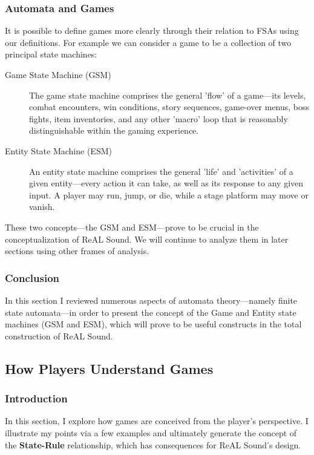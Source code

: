 \documentclass{report}
\newcommand{\rs}{ReAL Sound\xspace}
\newcommand{\state}[1]{\textbf{#1}}
\begin{document}
\subsubsection{Automata and Games}
It is possible to define games more clearly through their relation to FSAs using our definitions. For example we can consider a game to be a collection of two principal state machines: 
\begin{description}
    \item[Game State Machine (GSM)] The game state machine comprises the general 'flow' of a game---its levels, combat encounters, win conditions, story sequences, game-over menus, boss fights, item inventories, and any other 'macro' loop that is reasonably distinguishable within the gaming experience.
    \item[Entity State Machine (ESM)] An entity state machine comprises the general 'life' and 'activities' of a given entity---every action it can take, as well as its response to any given input. A player may run, jump, or die, while a stage platform may move or vanish.     
\end{description}

These two concepts---the GSM and ESM---prove to be crucial in the conceptualization of \rs. We will continue to analyze them in later sections using other frames of analysis.

\subsubsection{Conclusion}
In this section I reviewed numerous aspects of automata theory---namely finite state automata---in order to present the concept of the Game and Entity state machines (GSM and ESM), which will prove to be useful constructs in the total construction of \rs.


\subsection{How Players Understand Games}

\subsubsection{Introduction}
In this section, I explore how games are conceived from the player's perspective. I illustrate my points via a few examples and ultimately generate the concept of the \state{State-Rule} relationship, which has consequences for \rs's design.
 
\end{document}
